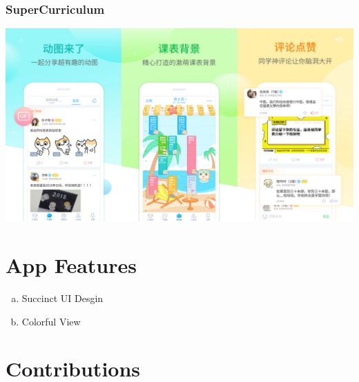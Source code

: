 \documentclass{article}
\begin{document}
    \subsubsection{SuperCurriculum}
    \begin{center}
        \includegraphics[width=6.5in]{SuperCurriculum}
    \end{center}




    \section{App Features}

    \begin{enumerate}[a)]
    \item Succinct UI Desgin
    
    \item Colorful View
    
    
    
    \end{enumerate}
    
 


    
    \section{Contributions}
\end{document}
